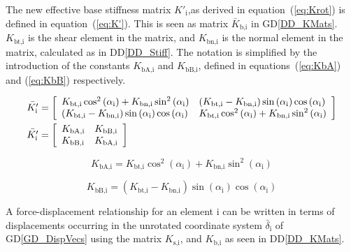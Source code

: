 \documentclass[12pt]{article}
\newcommand{\ddref}[1]{DD\ref{#1}}
\newcommand{\dref}[1]{GD\ref{#1}}
\begin{document}
\noindent
The new effective base stiffness matrix $K'_\text{i}$,as derived in
equation~(\ref{eq:Krot}) is defined in equation~(\ref{eq:K'}). This is
seen as matrix $\bar{K}_\text{b,i}$ in
\dref{DD_KMats}. $K_\text{bt,i}$ is the shear element in the matrix,
and $K_\text{bn,i}$ is the normal element in the matrix, calculated as
in \ddref{DD_Stiff}. The notation is simplified by the introduction of
the constants $K_\text{bA,i}$ and $K_\text{bB,i}$, defined in
equations~(\ref{eq:KbA}) and (\ref{eq:KbB}) respectively.

\begin{equation} \label{eq:K'}
  \begin{aligned} & \bar{ K'_\text{i}}
     = \left[ \begin{array}{l l}
          K_\text{bt,i} \cos^2\left(\alpha_\text{i}\right)+
          K_\text{bn,i} \sin^2\left(\alpha_\text{i}\right)
          & \left(K_\text{bt,i} - K_\text{bn,i}\right)
          \sin\left(\alpha_\text{i}\right)
          \cos\left(\alpha_\text{i}\right)\\
          \left(K_\text{bt,i} - K_\text{bn,i}\right)
          \sin\left(\alpha_\text{i}\right)
          \cos\left(\alpha_\text{i}\right)
          & K_\text{bt,i} \cos^2\left(\alpha_\text{i}\right)+
          K_\text{bn,i} \sin^2\left(\alpha_\text{i}\right)
      \end{array} \right] \\
    & \bar{ K'_\text{i}} = \left[ \begin{array}{l l}
        K_\text{bA,i} & K_\text{bB,i} \\
        K_\text{bB,i} & K_\text{bA,i}
      \end{array} \right] \end{aligned} \end{equation}


\begin{equation} \label{eq:KbA}
  K_\text{bA,i} = K_\text{bt,i} \cos^2\left(\alpha_\text{i}\right)+
                 K_\text{bn,i} \sin^2\left(\alpha_\text{i}\right)
\end{equation}

\begin{equation} \label{eq:KbB}
  K_\text{bB,i} = \left(K_\text{bt,i} - K_\text{bn,i}\right)
                 \sin\left(\alpha_\text{i}\right)
                 \cos\left(\alpha_\text{i}\right)
\end{equation}


\noindent
A force-displacement relationship for an element $\text{i}$ can be
written in terms of displacements occurring in the unrotated
coordinate system $\bar{\delta}_\text{i}$ of \dref{GD_DispVecs} using
the matrix $K_\text{s,i}$, and $K_\text{b,i}$ as seen in
\ddref{DD_KMats}.
\end{document}
